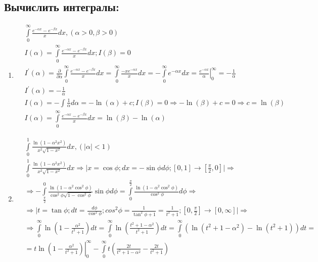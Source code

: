 \documentclass[a4paper, 12pt]{article}
\begin{document}
\subsection{Вычислить интегралы: }
\begin{enumerate}
 \item 
 \begin{align*}
  &\int\limits_0^\infty \frac{e^{-\alpha x}-e^{-\beta x}}{x}dx, (\alpha>0,\beta>0) \\
  &I(\alpha) = \int\limits_0^\infty \frac{e^{-\alpha x}-e^{-\beta x}}{x}dx; I(\beta) = 0  \\
  &I^{'}(\alpha) = 
  \frac{\partial}{\partial \alpha}\int\limits_0^\infty \frac{e^{-\alpha x}-e^{-\beta x}}{x}dx = 
  \int\limits_0^\infty\frac{-xe^{-\alpha x}}{x}dx = -\int\limits_0^\infty e^{-\alpha x}dx = 
  \left.\frac{e^{-\alpha x}}{\alpha}\right|_0^\infty = -\frac{1}{\alpha} \\
  &I^{'}(\alpha) = -\frac{1}{\alpha} \\
  &I(\alpha) = -\int \frac{1}{\alpha}d\alpha = -\ln(\alpha) + c; I(\beta) = 0 \Rightarrow -\ln(\beta) + c = 0 \Rightarrow c = \ln(\beta) \\
  &I(\alpha) = \int\limits_0^\infty \frac{e^{-\alpha x}-e^{-\beta x}}{x}dx = \ln(\beta) - \ln(\alpha)
 \end{align*}
\item
\begin{align*}
 &\int\limits_0^1 \frac{\ln(1-\alpha^2x^2)}{x^2\sqrt{1-x^2}}dx, (|\alpha| < 1) \\
 &\int\limits_0^1 \frac{\ln(1-\alpha^2x^2)}{x^2\sqrt{1-x^2}}dx \Rightarrow 
 \Big| x = \cos \phi; dx = -\sin\phi d\phi; [0,1]\to[\frac{\pi}{2},0] \Big| \Rightarrow \\
 &\Rightarrow -\int\limits_\frac{\pi}{2}^0 \frac{\ln(1-\alpha^2\cos^2\phi)}{\cos^2\phi\sqrt{1-\cos^2\phi}}\sin\phi d\phi = 
 \int\limits_0^\frac{\pi}{2}\frac{\ln(1-\alpha^2\cos^2\phi)}{\cos^2\phi}d\phi \Rightarrow \\
 &\Rightarrow\Big| t=\tan\phi; dt=\frac{d\phi}{\cos^2\phi}; cos^2\phi = \frac{1}{\tan^2\phi+1} = \frac{1}{t^2+1}; [0,\frac{\pi}{2}]\to[0,\infty]\Big|\Rightarrow \\
 &\Rightarrow\int\limits_0^\infty\ln\left(1-\frac{\alpha^2}{t^2+1}\right)dt = 
 \int\limits_0^\infty\ln\left(\frac{t^2+1-\alpha^2}{t^2+1}\right)dt = 
 \int\limits_0^\infty \left(\ln(t^2+1-\alpha^2) - \ln(t^2+1)\right)dt = \\
 &= \left.t\ln\left(1-\frac{\alpha^2}{t^2+1}\right)\right|_0^\infty - 
 \int\limits_0^\infty t\left(\frac{2t}{t^2+1-\alpha^2} - \frac{2t}{t^2+1}\right) \\

\end{align*}
\end{enumerate}
\end{document}

